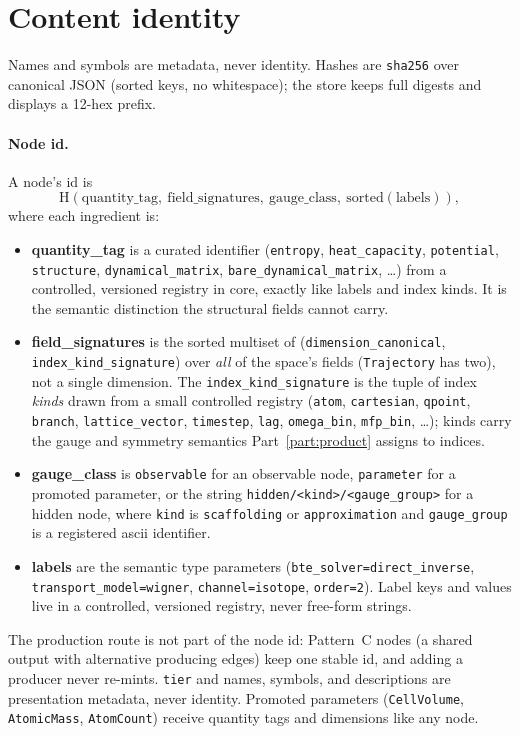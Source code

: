 \documentclass[11pt,a4paper]{article}
\begin{document}
\section{Content identity}
\label{sec:kernel-identity}

Names and symbols are metadata, never identity. Hashes are \texttt{sha256} over
canonical JSON (sorted keys, no whitespace); the store keeps full digests and
displays a 12-hex prefix.

\paragraph{Node id.} A node's id is
\[
  \mathrm{H}(\text{quantity\_tag},\ \text{field\_signatures},\ \text{gauge\_class},\ \mathrm{sorted}(\text{labels})),
\]
where each ingredient is:
\begin{itemize}[leftmargin=2em, itemsep=0.2em]
  \item \textbf{quantity\_tag} is a curated identifier (\texttt{entropy},
        \texttt{heat\_capacity}, \texttt{potential}, \texttt{structure},
        \texttt{dynamical\_matrix}, \texttt{bare\_dynamical\_matrix}, \ldots) from
        a controlled, versioned registry in core, exactly like labels and index
        kinds. It is the semantic distinction the structural fields cannot carry.
  \item \textbf{field\_signatures} is the sorted multiset of
        (\texttt{dimension\_canonical}, \texttt{index\_kind\_signature}) over
        \emph{all} of the space's fields (\texttt{Trajectory} has two), not a
        single dimension. The \texttt{index\_kind\_signature} is the tuple of
        index \emph{kinds} drawn from a small controlled registry
        (\texttt{atom}, \texttt{cartesian}, \texttt{qpoint}, \texttt{branch},
        \texttt{lattice\_vector}, \texttt{timestep}, \texttt{lag},
        \texttt{omega\_bin}, \texttt{mfp\_bin}, \ldots); kinds carry the
        gauge and symmetry semantics Part~\ref{part:product} assigns to indices.
  \item \textbf{gauge\_class} is \texttt{observable} for an observable node,
        \texttt{parameter} for a promoted parameter, or the string
        \texttt{hidden/<kind>/<gauge\_group>} for a hidden node, where
        \texttt{kind} is \texttt{scaffolding} or \texttt{approximation} and
        \texttt{gauge\_group} is a registered ascii identifier.
  \item \textbf{labels} are the semantic type parameters
        (\texttt{bte\_solver=direct\_inverse}, \texttt{transport\_model=wigner},
        \texttt{channel=isotope}, \texttt{order=2}). Label keys and values live in
        a controlled, versioned registry, never free-form strings.
\end{itemize}
The production route is not part of the node id: Pattern~C nodes (a shared output
with alternative producing edges) keep one stable id, and adding a producer never
re-mints. \texttt{tier} and names, symbols, and descriptions are presentation
metadata, never identity. Promoted parameters (\texttt{CellVolume},
\texttt{AtomicMass}, \texttt{AtomCount}) receive quantity tags and dimensions like
any node.
\end{document}
